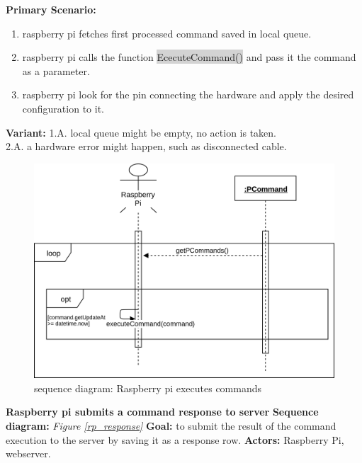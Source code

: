 \documentclass[12pt, oneside, a4paper]{book}
\newcommand{\code}[1]{{\color{red}\colorbox{lightgray}{#1}}}
\newcommand\boldcolor[1]{\textcolor{bold}{\textbf{#1}}}
\begin{document}
				\newline\textbf{Primary Scenario:}	
				\begin{enumerate}[label*=\arabic*.]
					\item raspberry pi fetches first processed command saved in local queue.
					\item raspberry pi calls the function \code{EcecuteCommand()} and pass it the command as a parameter.
					\item raspberry pi look for the pin connecting the hardware and apply the desired configuration to it.
				\end{enumerate}
				\textbf{Variant:}\newline	
				\hspace*{5mm}1.A. local queue might be empty, no action is taken. \\
				\hspace*{5mm}2.A. a hardware error might happen, such as disconnected cable. \\
				\begin{figure}[H]
					\includegraphics[width=\linewidth]{img/sequence_execute.png}
					\caption{sequence diagram: Raspberry pi executes commands}					
					\label{rp_execute}
				\end{figure}
				\newpage\hspace*{-6mm}\boldcolor{Raspberry pi submits a command response to server}
				\newline\textbf{Sequence diagram:} \textit{Figure \ref{rp_response}}
				\newline\textbf{Goal:} to submit the result of the command execution to the server by saving it as a response row.
				\newline\textbf{Actors:} Raspberry Pi, webserver.
\end{document}
